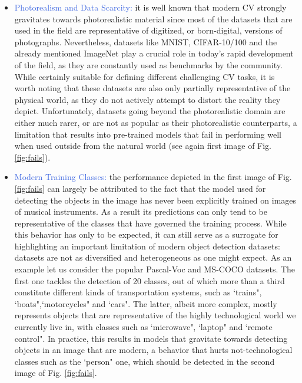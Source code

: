 \begin{itemize}
	\item \textcolor{RoyalBlue}{Photorealism and Data Scarcity:} it is well known that modern CV strongly gravitates towards photorealistic material since most of the datasets that are used in the field are representative of digitized, or born-digital, versions of photographs. Nevertheless, datasets like MNIST, CIFAR-10/100 and the already mentioned ImageNet play a crucial role in today's rapid development of the field, as they are constantly used as benchmarks by the community. While certainly suitable for defining different challenging CV tasks, it is worth noting that these datasets are also only partially representative of the physical world, as they do not actively attempt to distort the reality they depict. Unfortunately, datasets going beyond the photorealistic domain are either much rarer, or are not as popular as their photorealistic counterparts, a limitation that results into pre-trained models that fail in performing well when used outside from the natural world (see again first image of Fig. \ref{fig:fails}).  

	\item \textcolor{RoyalBlue}{Modern Training Classes:} the performance depicted in the first image of Fig. \ref{fig:fails} can largely be attributed to the fact that the model used for detecting the objects in the image has never been explicitly trained on images of musical instruments. As a result its predictions can only tend to be representative of the classes that have governed the training process. While this behavior has only to be expected, it can still serve as a surrogate for highlighting an important limitation of modern object detection datasets: datasets are not as diversified and heterogeneous as one might expect. As an example let us consider the popular Pascal-Voc \cite{everingham2010pascal} and MS-COCO \cite{lin2014microsoft} datasets. The first one tackles the detection of 20 classes, out of which more than a third constitute different kinds of transportation systems, such as `trains", `boats",`motorcycles" and `cars". The latter, albeit more complex, mostly represents objects that are representative of the highly technological world we currently live in, with classes such as `microwave", `laptop" and `remote control". In practice, this results in models that gravitate towards detecting objects in an image that are modern, a behavior that hurts not-technological classes such as the `person" one, which should be detected in the second image of Fig. \ref{fig:fails}.     


\end{itemize}
